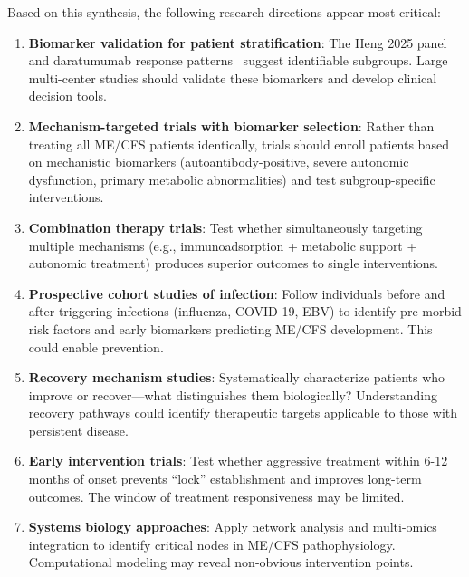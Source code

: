 Based on this synthesis, the following research directions appear most critical:

\begin{enumerate}
    \item \textbf{Biomarker validation for patient stratification}: The Heng 2025 panel~\cite{heng2025mecfs} and daratumumab response patterns~\cite{Fluge2025daratumumab} suggest identifiable subgroups. Large multi-center studies should validate these biomarkers and develop clinical decision tools.

    \item \textbf{Mechanism-targeted trials with biomarker selection}: Rather than treating all ME/CFS patients identically, trials should enroll patients based on mechanistic biomarkers (autoantibody-positive, severe autonomic dysfunction, primary metabolic abnormalities) and test subgroup-specific interventions.

    \item \textbf{Combination therapy trials}: Test whether simultaneously targeting multiple mechanisms (e.g., immunoadsorption + metabolic support + autonomic treatment) produces superior outcomes to single interventions.

    \item \textbf{Prospective cohort studies of infection}: Follow individuals before and after triggering infections (influenza, COVID-19, EBV) to identify pre-morbid risk factors and early biomarkers predicting ME/CFS development. This could enable prevention.

    \item \textbf{Recovery mechanism studies}: Systematically characterize patients who improve or recover---what distinguishes them biologically? Understanding recovery pathways could identify therapeutic targets applicable to those with persistent disease.

    \item \textbf{Early intervention trials}: Test whether aggressive treatment within 6-12 months of onset prevents ``lock'' establishment and improves long-term outcomes. The window of treatment responsiveness may be limited.

    \item \textbf{Systems biology approaches}: Apply network analysis and multi-omics integration to identify critical nodes in ME/CFS pathophysiology. Computational modeling may reveal non-obvious intervention points.
\end{enumerate}

